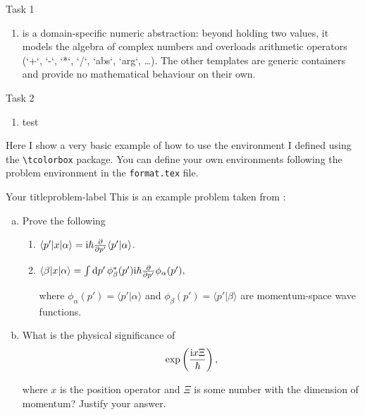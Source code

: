\begin{problem}{}{Task 1}
\begin{enumerate}[(1)]
        \item  
             is a domain-specific numeric
            abstraction: beyond holding two values, it models the algebra
            of complex numbers and overloads arithmetic operators
            (`+`, `-`, `*`, `/`, `abs`, `arg`, …).
            The other templates are generic containers and provide no
            mathematical behaviour on their own.
    \end{enumerate}
\end{problem}

\pagebreak

\begin{problem}{}{Task 2}
    \begin{enumerate}[(1)]
        \item test
    \end{enumerate}
\end{problem}

\pagebreak

Here I show a very basic example of how to use the  environment I defined using the \verb|\tcolorbox| package. You can define your own environments following the problem environment in the \texttt{format.tex} file.

\begin{problem}{Your title}{problem-label}
This is an example problem taken from \cite{Sakurai2020}:

\begin{enumerate}[(a)]
    \item Prove the following
    \begin{enumerate}[label = (\roman*)]
        \item $\langle p' | x | \alpha \rangle = \mathrm{i} \hbar \pdv{}{p'} \langle p' | \alpha \rangle$.

        \item $\langle \beta | x | \alpha \rangle = \int \dd{p'} \phi_{\beta}^{*} (p') \mathrm{i} \hbar \pdv{}{p'} \phi_{\alpha} (p'),$

        where $\phi_{\alpha}(p') = \langle p' | \alpha \rangle$ and $\phi_{\beta}(p') = \langle p' | \beta \rangle$ are momentum-space wave functions.
    \end{enumerate}

    \item What is the physical significance of 
    \[
    \exp\left(\dfrac{\mathrm{i} x \Xi}{\hbar}\right),
    \]

    where $x$ is the position operator and $\Xi$ is some number with the dimension of momentum? Justify your answer.
\end{enumerate}
\end{problem}

